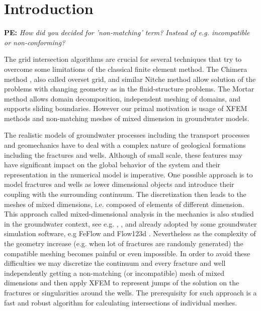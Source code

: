 \documentclass{elsarticle}
\newcommand{\notePE}[1]{{\color{Orange} \textbf{PE: } \textit{#1}}}
\begin{document}

\section{Introduction}
\notePE{How did you decided for 'non-matching' term? Instead of e.g. incompatible or non-conforming?}

The grid intersection algorithms are crucial for several techniques that try to overcome some limitations of the classical finite element method.
The Chimera method \cite{brezzi_analysis_2001}, also called overset grid, and similar Nitche method \cite{massing_efficient_2013}
allow solution of the problems with changing geometry as in the fluid-structure problems. 
The Mortar method \cite{belgacem_mortar_1999} allows domain decomposition, independent meshing of domains, and supports sliding boundaries.
However our primal motivation is usage of XFEM methods and non-matching meshes of mixed dimension in groundwater models.

The realistic models of groundwater processes including the transport processes and geomechanics have to deal with 
a complex nature of geological formations including the fractures and wells. Although of small scale, these features may have significant impact 
on the global behavior of the system and their representation in the numerical model is imperative.
One possible approach is to model fractures and wells as lower dimensional objects and introduce their coupling with the surrounding continuum. 
The discretization then leads to the meshes of mixed dimensions, i.e. composed of elements of different dimension. This approach 
called mixed-dimensional analysis in the mechanics \cite{bournival_mesh-geometry_2008} is also studied in the groundwater context, see e.g. 
\cite{martin_modeling_2005}, \cite{fumagalli_numerical_2011}, \cite{brezina_analysis_2015} and 
already adopted by some groundwater simulation software, e.g FeFlow \cite{trefry_feflow:_2007} and Flow123d \cite{flow123d}.
Nevertheless as the complexity of the geometry increase (e.g. when lot of fractures are randomly generated) the compatible meshing becomes painful or even 
impossible. In order to avoid these difficulties we may discretize the continuum and every fracture and well independently getting a non-matching 
(or incompatible) mesh of mixed dimensions and then apply XFEM to represent jumps of the solution on the fractures or singularities 
around the wells. The prerequisity for such approach is a fast and robust algorithm for calculating intersections of individual meshes.
\end{document}
